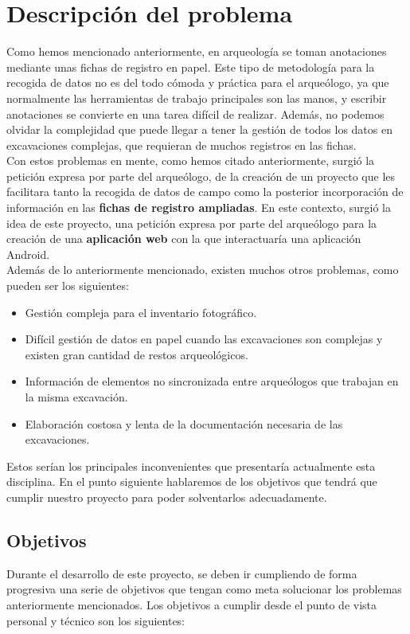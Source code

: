 \chapter{Descripción del problema}
Como hemos mencionado anteriormente, en arqueología se toman anotaciones mediante unas fichas
de registro en papel. Este tipo de metodología para la recogida de datos no es del todo cómoda
y práctica para el arqueólogo, ya que normalmente las herramientas de trabajo principales son
las manos, y escribir anotaciones se convierte en una tarea difícil de realizar. Además, no
podemos olvidar la complejidad que puede llegar a tener la gestión de todos los datos en
excavaciones complejas, que requieran de muchos registros en las fichas. \\

Con estos problemas en mente, como hemos citado anteriormente, surgió la petición expresa por
parte del arqueólogo, de la creación de un proyecto que les facilitara tanto la recogida de datos
de campo como la posterior incorporación de información en las \textbf{fichas de registro
ampliadas}. En este contexto, surgió la idea de este proyecto, una petición expresa por parte
del arqueólogo para la creación de una \textbf{aplicación web} con la que interactuaría una
aplicación Android. \\

Además de lo anteriormente mencionado, existen muchos otros problemas, como pueden ser los
siguientes:

    \begin{itemize}
        \item Gestión compleja para el inventario fotográfico.
        \item Difícil gestión de datos en papel cuando las excavaciones son complejas y
        existen gran cantidad de restos arqueológicos.
        \item Información de elementos no sincronizada entre arqueólogos que trabajan en la
        misma excavación.
        \item Elaboración costosa y lenta de la documentación necesaria de las excavaciones.
    \end{itemize}

Estos serían los principales inconvenientes que presentaría actualmente esta disciplina. En
el punto siguiente hablaremos de los objetivos que tendrá que cumplir nuestro proyecto para
poder solventarlos adecuadamente.

\section{Objetivos}
Durante el desarrollo de este proyecto, se deben ir cumpliendo de forma progresiva una serie
de objetivos que tengan como meta solucionar los problemas anteriormente mencionados. Los
objetivos a cumplir desde el punto de vista personal y técnico son los siguientes:

